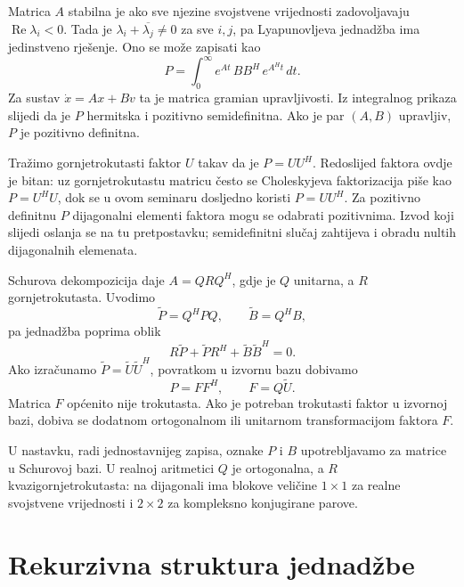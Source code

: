 \documentclass[12pt,a4paper]{article}
\begin{document}
Matrica $A$ stabilna je ako sve njezine svojstvene vrijednosti zadovoljavaju $\operatorname{Re}\lambda_i < 0$. Tada je $\lambda_i + \overline{\lambda_j} \neq 0$ za sve $i,j$, pa Lyapunovljeva jednadžba ima jedinstveno rješenje. Ono se može zapisati kao
\[
P = \int_0^\infty e^{At}\,BB^{H}\,e^{A^{H}t}\,dt.
\]
Za sustav $\dot{x} = Ax + Bv$ ta je matrica gramian upravljivosti. Iz integralnog prikaza slijedi da je $P$ hermitska i pozitivno semidefinitna. Ako je par $(A,B)$ upravljiv, $P$ je pozitivno definitna.

Tražimo gornjetrokutasti faktor $U$ takav da je $P = UU^{H}$. Redoslijed faktora ovdje je bitan: uz gornjetrokutastu matricu često se Choleskyjeva faktorizacija piše kao $P = U^{H}U$, dok se u ovom seminaru dosljedno koristi $P = UU^{H}$. Za pozitivno definitnu $P$ dijagonalni elementi faktora mogu se odabrati pozitivnima. Izvod koji slijedi oslanja se na tu pretpostavku; semidefinitni slučaj zahtijeva i obradu nultih dijagonalnih elemenata.

Schurova dekompozicija daje $A = QRQ^{H}$, gdje je $Q$ unitarna, a $R$ gornjetrokutasta. Uvodimo
\[
\widetilde{P} = Q^{H}PQ, \qquad \widetilde{B} = Q^{H}B,
\]
pa jednadžba poprima oblik
\[
R\widetilde{P} + \widetilde{P}R^{H} + \widetilde{B}\widetilde{B}^{H} = 0.
\]
Ako izračunamo $\widetilde{P} = \widetilde{U}\widetilde{U}^{H}$, povratkom u izvornu bazu dobivamo
\[
P = FF^{H}, \qquad F = Q\widetilde{U}.
\]
Matrica $F$ općenito nije trokutasta. Ako je potreban trokutasti faktor u izvornoj bazi, dobiva se dodatnom ortogonalnom ili unitarnom transformacijom faktora $F$.

U nastavku, radi jednostavnijeg zapisa, oznake $P$ i $B$ upotrebljavamo za matrice u Schurovoj bazi. U realnoj aritmetici $Q$ je ortogonalna, a $R$ kvazigornjetrokutasta: na dijagonali ima blokove veličine $1\times 1$ za realne svojstvene vrijednosti i $2\times 2$ za kompleksno konjugirane parove.

\section{Rekurzivna struktura jednadžbe}
\end{document}
